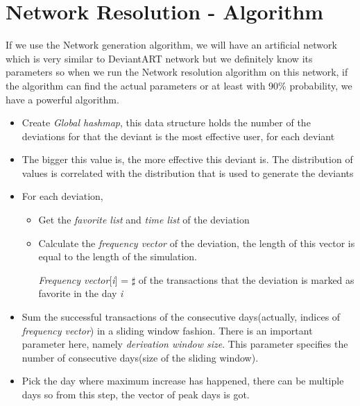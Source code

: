 \documentclass[12pt,a4paper]{report}
\begin{document}
\chapter{Network Resolution - Algorithm}

	If we use the Network generation algorithm, we will have an artificial network which is very similar to DeviantART network but we definitely know its parameters so when we run the Network resolution algorithm on this network, if the algorithm can find the actual parameters or at least with 90\% probability, we have a powerful algorithm. 

	\begin{itemize}

	\item Create \emph{Global hashmap}, this data structure holds the number of the deviations for that the deviant is the most effective user, for each deviant

	\item The bigger this value is, the more effective this deviant is. The distribution of values is correlated with the distribution that is used to generate the deviants

	\item For each deviation,

		\begin{itemize}

		\item Get the \emph{favorite list} and \emph{time list} of the deviation

		\item Calculate the \emph{frequency vector} of the deviation, the length of this vector is equal to the length of the simulation. 

			\emph{Frequency vector}[\emph{i}] = $\sharp$ of the transactions that the deviation is marked as favorite in the day \emph{i}

		\end{itemize}

	\item Sum the successful transactions of the consecutive days(actually, indices of \emph{frequency vector}) in a sliding window fashion. There is an important parameter here, namely \emph{derivation window size}. This parameter specifies the number of consecutive days(size of the sliding window).

	\item Pick the day where maximum increase has happened, there can be multiple days so from this step, the vector of peak days is got.


\end{itemize}
\end{document}
